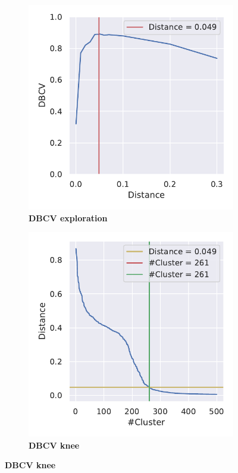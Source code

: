 \begin{figure}[!htb]
    \centering
    \begin{subfigure}[b]{0.475\textwidth}
        \caption[DBCV exploration]{\textbf{DBCV exploration}}
        \label{subfig:UMAP_Cluster_DBCV_Explo_4}            \includegraphics[width=\textwidth]{UMAP/Cluster_DBCV_Segment_4.pdf}
    \end{subfigure}
    \hfill
    \begin{subfigure}[b]{0.475\textwidth}
        \caption[DBCV knee]{\textbf{DBCV knee}}
        \label{subfig:UMAP_Cluster_DBCV_Elbow_4}            \includegraphics[width=\textwidth]{UMAP/Cluster_Elbow_DBCV_Segment_4.pdf}

\end{subfigure}
\end{figure}
